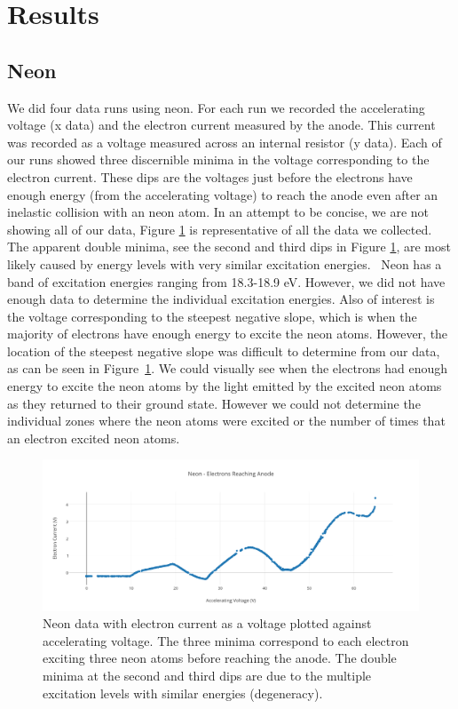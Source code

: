 \documentclass[prb,preprint]{revtex4-1}
\begin{document}
\section{Results}

\subsection{Neon}

We did four data runs using neon. For each run we recorded the accelerating voltage (x data) and the electron current measured by the anode. This current was recorded as a voltage measured across an internal resistor (y data). Each of our runs showed three discernible minima in the voltage corresponding to the electron current. These dips are the voltages just before the electrons have enough energy (from the accelerating voltage) to reach the anode even after an inelastic collision with an neon atom. In an attempt to be concise, we are not showing all of our data, Figure \ref{neon_data} is representative of all the data we collected. The apparent double minima, see the second and third dips in Figure \ref{neon_data}, are most likely caused by energy levels with very similar excitation energies.~\cite{newfeatures} Neon has a band of excitation energies ranging from 18.3-18.9 eV. However, we did not have enough data to determine the individual excitation energies. Also of interest is the voltage corresponding to the steepest negative slope, which is when the majority of electrons have enough energy to excite the neon atoms. However, the location of the steepest negative slope was difficult to determine from our data, as can be seen in Figure~\ref{neon_data}. We could visually see when the electrons had enough energy to excite the neon atoms by the light emitted by the excited neon atoms as they returned to their ground state. However we could not determine the individual zones where the neon atoms were excited or the number of times that an electron excited neon atoms.

\begin{figure}[h!]
\centering

\includegraphics[width=6in]{neon_data.pdf}
\caption{Neon data with electron current as a voltage plotted against accelerating voltage. The three minima correspond to each electron exciting three neon atoms before reaching the anode. The double minima at the second and third dips are due to the multiple excitation levels with similar energies (degeneracy).}

\label{neon_data}
\end{figure}
\end{document}
